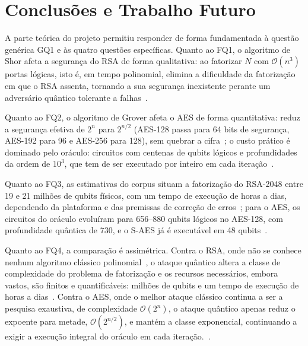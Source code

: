 \documentclass[11pt,a4paper]{article}
\begin{document}
\clearpage

\section{Conclusões e Trabalho Futuro}\label{sec:conclusoes}

A parte teórica do projeto permitiu responder de forma fundamentada à questão genérica GQ1 e às quatro questões específicas. Quanto ao FQ1, o algoritmo de Shor afeta a segurança do RSA de forma qualitativa: ao fatorizar $N$ com $\mathcal{O}(n^{3})$ portas lógicas, isto é, em tempo polinomial, elimina a dificuldade da fatorização em que o RSA assenta, tornando a sua segurança inexistente perante um adversário quântico tolerante a falhas~\cite{zhou2025,oonishi2026}.

Quanto ao FQ2, o algoritmo de Grover afeta o AES de forma quantitativa: reduz a segurança efetiva de $2^{n}$ para $2^{n/2}$ (AES-128 passa para 64 bits de segurança, AES-192 para 96 e AES-256 para 128), sem quebrar a cifra~\cite{chethana2025,wang2022}; o custo prático é dominado pelo oráculo: circuitos com centenas de qubits lógicos e profundidades da ordem de $10^{3}$, que tem de ser executado por inteiro em cada iteração~\cite{wang2022,huang2022,liu2023}.

Quanto ao FQ3, as estimativas do corpus situam a fatorização do RSA-2048 entre 19 e 21 milhões de qubits físicos, com um tempo de execução de horas a dias, dependendo da plataforma e das premissas de correção de erros~\cite{luongo2025,zhou2025}; para o AES, os circuitos do oráculo evoluíram para 656--880 qubits lógicos no AES-128, com profundidade quântica de 730, e o S-AES já é executável em 48 qubits~\cite{wang2022,liu2023}.

Quanto ao FQ4, a comparação é assimétrica. Contra o RSA, onde não se conhece nenhum algoritmo clássico polinomial~\cite{zhou2025}, o ataque quântico altera a classe de complexidade do problema de fatorização e os recursos necessários, embora vastos, são finitos e quantificáveis: milhões de qubits e um tempo de execução de horas a dias~\cite{zhou2025,oonishi2026}. Contra o AES, onde o melhor ataque clássico continua a ser a pesquisa exaustiva, de complexidade $\mathcal{O}(2^{n})$, o ataque quântico apenas reduz o expoente para metade, $\mathcal{O}(2^{n/2})$, e mantém a classe exponencial, continuando a exigir a execução integral do oráculo em cada iteração.~\cite{huang2022,liu2023,chethana2025}.
\end{document}
